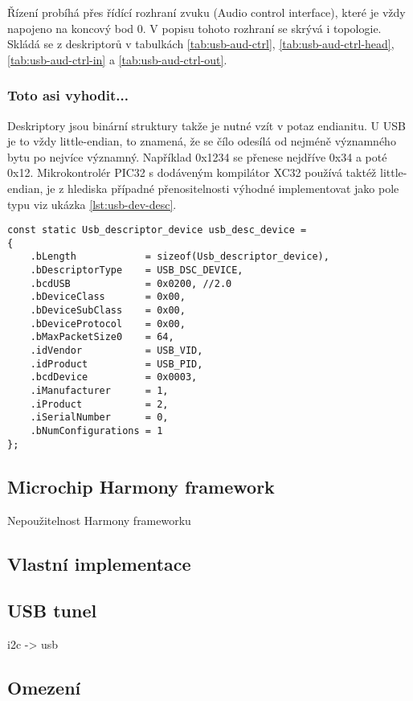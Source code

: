 Řízení probíhá přes řídící rozhraní zvuku (Audio control interface), které je vždy napojeno na koncový bod 0.  V popisu tohoto rozhraní se skrývá i topologie. Skládá se z deskriptorů v tabulkách \ref{tab:usb-aud-ctrl}, \ref{tab:usb-aud-ctrl-head}, \ref{tab:usb-aud-ctrl-in} a \ref{tab:usb-aud-ctrl-out}.

\subsubsection{Toto asi vyhodit...}
Deskriptory jsou binární struktury takže je nutné vzít v potaz endianitu. U USB je to vždy little-endian, to znamená, že se čílo odesílá od nejméně významného bytu po nejvíce významný. Například 0x1234 se přenese nejdříve 0x34 a poté 0x12. Mikrokontrolér PIC32 s dodáveným kompilátor XC32 používá taktéž little-endian, je z hlediska případné přenositelnosti výhodné implementovat jako pole typu  viz ukázka \ref{lst:usb-dev-desc}.
\begin{lstlisting}[caption=Deskriptor zařízení.]
const static Usb_descriptor_device usb_desc_device =
{
    .bLength            = sizeof(Usb_descriptor_device),
    .bDescriptorType    = USB_DSC_DEVICE,
    .bcdUSB             = 0x0200, //2.0
    .bDeviceClass       = 0x00,
    .bDeviceSubClass    = 0x00,
    .bDeviceProtocol    = 0x00,
    .bMaxPacketSize0    = 64,
    .idVendor           = USB_VID,
    .idProduct          = USB_PID,
    .bcdDevice          = 0x0003,
    .iManufacturer      = 1,
    .iProduct           = 2,
    .iSerialNumber      = 0,
    .bNumConfigurations = 1
};
\end{lstlisting}
\label{lst:usb-dev-desc}




\subsection{Microchip Harmony framework}
Nepoužitelnost Harmony frameworku\\

\subsection{Vlastní implementace}

\subsection{USB \iic tunel}
i2c -> usb\\


\subsection{Omezení}

